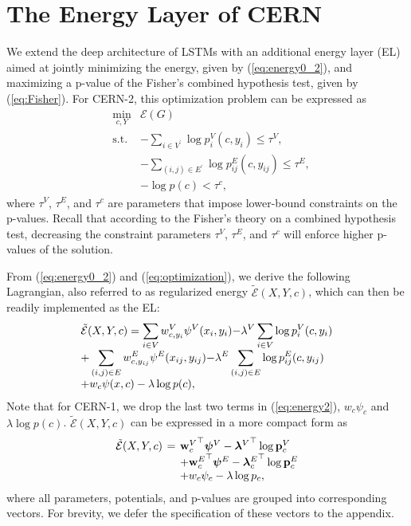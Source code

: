 \documentclass[10pt,twocolumn,letterpaper]{article}
\begin{document}
\section{The Energy Layer of CERN}
\label{sec:EL}
We extend the deep architecture of LSTMs with an additional energy layer (EL) aimed at jointly minimizing the energy, given by (\ref{eq:energy0_2}), and maximizing a p-value of the Fisher's combined hypothesis test, given by (\ref{eq:Fisher}).  For CERN-2, this optimization problem can be expressed as %
%
\begin{equation}
\begin{array}{lcl}
& \displaystyle \min_{c, Y} & \displaystyle \mathcal{E}(G)\\
 &\text{s.t.} & -\sum_{i\in V^\prime} \log p^V_i(c,y_i) \leq \tau^V,\\
 && -\sum_{(i,j) \in E^\prime} \log p^E_{ij}(c, y_{ij}) \leq \tau^E, \\
 && -\log p(c) < \tau^c,
 \end{array}
 \label{eq:optimization}
\end{equation}
where $\tau^V$, $\tau^E$, and $\tau^c$ are parameters that impose lower-bound constraints on the p-values. Recall that according to the Fisher's theory on a combined hypothesis test, decreasing the constraint parameters $\tau^V$, $\tau^E$, and $\tau^c$ will enforce higher p-values of the solution.

From (\ref{eq:energy0_2}) and (\ref{eq:optimization}), we derive the following Lagrangian, also referred to as  regularized energy $\tilde{\mathcal{E}}(X,Y, c)$, which can then be readily implemented as the EL:
\begin{equation}
\setlength{\arraycolsep}{0pt}
\begin{array}{l}
 \tilde{\mathcal{E}}(X,Y, c) =
 \displaystyle \sum_{i 
\in V}  w^V_{c,y_i}\psi^V(x_i,y_i){-} \lambda^V \sum_{i 
\in V}  \log p^V_i(c,y_i) \\ \displaystyle
+  \sum_{(i, j) \in E}w^E_{c,y_{ij}}  \psi^E(x_{ij},y_{ij}){-}  \lambda^E \sum_{(i, j) \in E}\log p^E_{ij}(c,y_{ij})\\
\displaystyle
+ w_c\psi(x, c) - \lambda\log p(c),
\end{array}
\label{eq:energy2}
\end{equation}
%
%
Note that for CERN-1, we drop the last two terms in (\ref{eq:energy2}), $w_c\psi_c$ and $\lambda\log p(c)$.
 $\tilde{\mathcal{E}}(X,Y, c)$ can be expressed in a more compact form as%
\begin{equation}
\setlength{\arraycolsep}{2pt}
\begin{array}{lcl}
 \tilde{\mathcal{E}}(X,Y, c) &=& {\ob_c^V}^\top\psib^V - {\lb^V}^\top \log\pb_c^V \\
 &&+ {\ob_c^E}^\top\psib^E - {\lb_c^E}^\top \log\pb_c^E \\
 &&+w_c\psi_c - \lambda\log p_c,
\end{array}
\label{eq:energy_c}
\end{equation}
%
%
where all parameters, potentials, and p-values are grouped into corresponding vectors. For brevity, we defer the specification of these vectors to the appendix.  
\end{document}
